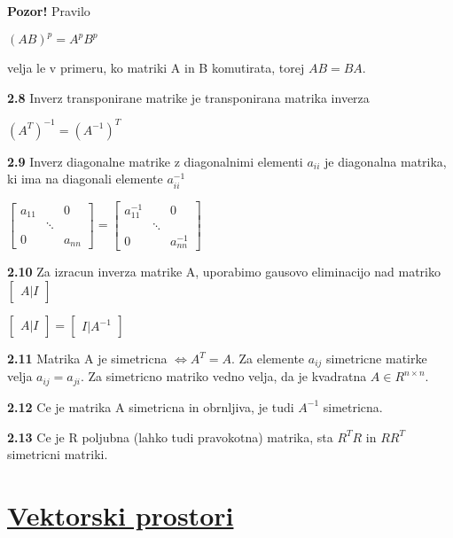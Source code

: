 \documentclass{article}
\begin{document}
\begin{multicols}{4}
	\textbf{Pozor!} Pravilo
	\begin{center}
		$(AB)^{p} = A^{p}B^{p}$
	\end{center}
	velja le v primeru, ko matriki A in B komutirata, torej $AB = BA$.

	\textbf{2.8} Inverz transponirane matrike je transponirana matrika inverza
	\begin{center}
		$(A^{T})^{-1} = (A^{-1})^{T}$
	\end{center}

	\textbf{2.9} Inverz diagonalne matrike z diagonalnimi elementi $a_{ii}$ je
	diagonalna matrika, ki ima na diagonali elemente $a_{ii}^{-1}$
	\begin{center}
		$\begin{bmatrix}
				a_{11} &        & 0      \\
				       & \ddots &        \\
				0      &        & a_{nn}
			\end{bmatrix}=
			\begin{bmatrix}
				a_{11}^{-1} &        & 0           \\
				            & \ddots &             \\
				0           &        & a_{nn}^{-1}
			\end{bmatrix}
		$
	\end{center}

	\textbf{2.10} Za izracun inverza matrike A, uporabimo gausovo eliminacijo nad
	matriko $\begin{bmatrix}A|I\end{bmatrix}$
	\begin{center}
		$\begin{bmatrix}A|I\end{bmatrix} =
			\begin{bmatrix}I|A^{-1}\end{bmatrix}
		$
	\end{center}

	\textbf{2.11} Matrika A je simetricna $\Leftrightarrow A^{T} = A$. Za elemente
	$a_{ij}$ simetricne matirke velja $a_{ij} = a_{ji}$. Za simetricno matriko vedno velja,
	da je kvadratna $A \in R^{n \times n}$.

	\textbf{2.12} Ce je matrika A simetricna in obrnljiva, je tudi $A^{-1}$ simetricna.

	\textbf{2.13} Ce je R poljubna (lahko tudi pravokotna) matrika, sta $R^{T}R$ in
	$RR^{T}$ simetricni matriki.

	\section{\underline{Vektorski prostori}}


\end{multicols}
\end{document}
